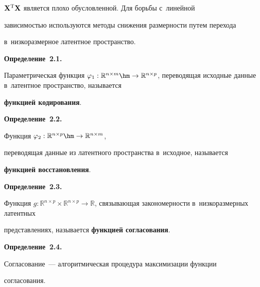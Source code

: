 ${\mathbf{X}}^{\mathrm{T}} \mathbf{X}$ является плохо обусловленной. Для борьбы с~линейной 

зависимостью используются методы снижения размерности путем перехода 

в~низкоразмерное латентное пространство.



\smallskip



\noindent

\textbf{Определение~2.1.}

Параметрическая функция $\varphi_1: \mathbb{R}^{n \times m} \hm\to \mathbb{R}^{n 

\times p}$, переводящая исходные данные в~латентное пространство, называется 

\textbf{функцией кодирования}.





\smallskip



\noindent

\textbf{Определение~2.2.}

    Функция $\varphi_2: \mathbb{R}^{n \times p} \hm\to \mathbb{R}^{n \times m}$, 

переводящая данные из латентного пространства в~исходное, называется 

\textbf{функцией восстановления}.





\smallskip



\noindent

\textbf{Определение~2.3.}

    Функция $g: \mathbb{R}^{n \times p}\times \mathbb{R}^{n \times p} \to 

\mathbb{R}$, связывающая закономерности в~низкоразмерных латентных 

представлениях, называется \textbf{функцией согласования}.





\smallskip



\noindent

\textbf{Определение~2.4.}

    Согласование~--- алгоритмическая процедура максимизации функции 

согласования.






